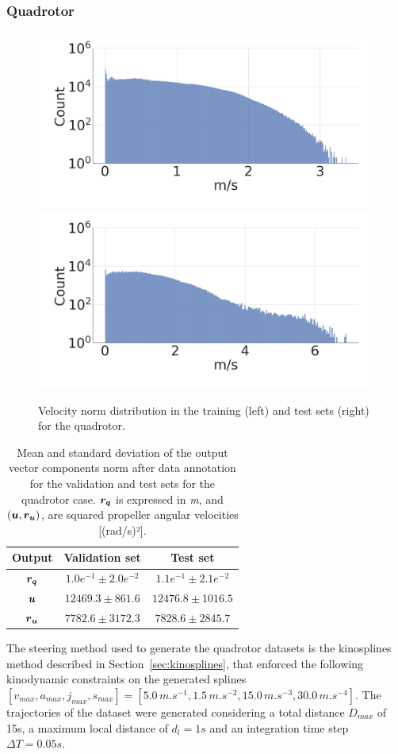 \subsubsection{Quadrotor}\label{sec:dataset_quad}

\begin{figure} [htp]
    \centering
    \includegraphics[width=0.49\linewidth]{figures/learning_quadrotor/vnorm_val2.png}
    \includegraphics[width=0.49\linewidth]{figures/learning_quadrotor/vnorm_test.png}
    \caption{Velocity norm distribution in the training (left) and test sets (right) for the quadrotor.}%
    \label{fig: valvstest}%
\end{figure}

\begin{table}[htp]
    \centering
    \begin{tabular}{ | c | c || c |}
    \hline
      \textbf{Output}  & \textbf{Validation set}  & \textbf{Test set} \\ \hline
    $\boldsymbol{r_q}$ & $1.0e^{-1} \pm 2.0e^{-2}$ & $1.1e^{-1} \pm 2.1e^{-2}$ \\ \hline
    $\boldsymbol{u}$ & $12469.3 \pm 861.6$ & $12476.8 \pm 1016.5$ \\ \hline
    $\boldsymbol{r_u}$ & $7782.6 \pm 3172.3$ & $7828.6 \pm 2845.7$ \\ \hline
\end{tabular}
\caption{
Mean and standard deviation of the output vector components norm after data annotation for the validation and test sets for the quadrotor case.
$\boldsymbol{r_q}$ is expressed in \emph{m}, and $(\boldsymbol{u}, \boldsymbol{r_u})$, are squared propeller angular velocities [(rad/s)²].}
 \label{tab:datas_stats}
\end{table}

The steering method used to generate the quadrotor datasets is the kinosplines method described in Section~\ref{sec:kinosplines}, that enforced the following kinodynamic constraints on the generated splines $[v_{max}, a_{max}, j_{max}, s_{max}] = [5.0 \, m.s^{-1}, \allowbreak 1.5 \, m.s^{-2}, \allowbreak 15.0 \, m.s^{-3}, \allowbreak 30.0 \, m.s^{-4}]$. 
The trajectories of the dataset were generated considering a total distance $D_{max}$ of 15s, a maximum local distance of $d_l = 1s$ and an integration time step $\Delta T = 0.05s$. 

